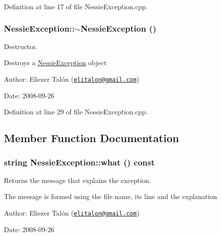 Definition at line 17 of file NessieException.cpp.\hypertarget{class_nessie_exception_19f44d2725dd53e2f10505a88e5773f2}{
\subsubsection[$\sim$NessieException]{\setlength{\rightskip}{0pt plus 5cm}NessieException::$\sim$NessieException ()}}
\label{class_nessie_exception_19f44d2725dd53e2f10505a88e5773f2}


Destructor. 

Destroys a \hyperlink{class_nessie_exception}{NessieException} object

\begin{Desc}
\item[Author:]Eliezer Talón (\href{mailto:elitalon@gmail.com}{\tt elitalon@gmail.com}) \end{Desc}
\begin{Desc}
\item[Date:]2008-09-26 \end{Desc}


Definition at line 29 of file NessieException.cpp.

\subsection{Member Function Documentation}
\hypertarget{class_nessie_exception_ec94145f2fd5febb7ca0b7587652b777}{
\subsubsection[what]{\setlength{\rightskip}{0pt plus 5cm}string NessieException::what () const}}
\label{class_nessie_exception_ec94145f2fd5febb7ca0b7587652b777}


Returns the message that explains the exception. 

The message is formed using the file name, its line and the explanation

\begin{Desc}
\item[Author:]Eliezer Talón (\href{mailto:elitalon@gmail.com}{\tt elitalon@gmail.com}) \end{Desc}
\begin{Desc}
\item[Date:]2008-09-26 \end{Desc}


